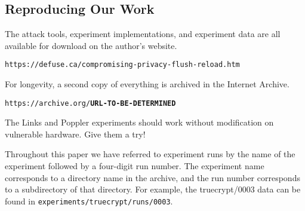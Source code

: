 \documentclass[letterpaper,twocolumn,10pt]{article}
\begin{document}
\begin{appendices}
    \section{Reproducing Our Work}
    \label{sec:reproducing}

    The attack tools, experiment implementations, and experiment data are all
    available for download on the author's website.

    \texttt{https://defuse.ca/compromising-privacy-flush-reload.htm}

    For longevity, a second copy of everything is archived in the Internet
    Archive.

    \texttt{https://archive.org/\textbf{URL-TO-BE-DETERMINED}}

    The Links and Poppler experiments should work without modification on
    vulnerable hardware. Give them a try!

    Throughout this paper we have referred to experiment runs by the name of the
    experiment followed by a four-digit run number. The experiment name
    corresponds to a directory name in the archive, and the run number
    corresponds to a subdirectory of that directory. For example, the
    truecrypt/0003 data can be found in
    \texttt{experiments/truecrypt/runs/0003}.
\end{appendices}
\end{document}
